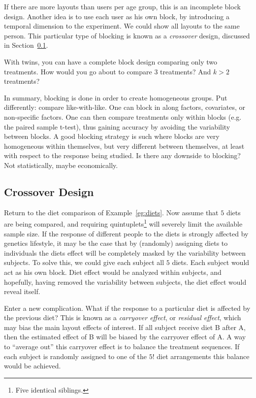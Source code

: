 If there are more layouts than users per age group, this is an incomplete block design. 
Another idea is to use each user as his own block, by introducing a temporal dimension to the experiment.
We could show all layouts to the same person. 
This particular type of blocking is known as a \emph{crossover} design, discussed in Section~\ref{sec:crossover}.

\begin{think}
	With twins, you can have a complete block design comparing only two treatments. 
	How would you go about to compare $3$ treatments?
	And $k>2$ treatments?
\end{think}

In summary, blocking is done in order to create homogeneous groups. 
Put differently: compare like-with-like. 
One can block in along factors, covariates, or non-specific factors. 
One can then compare treatments only within blocks (e.g. the paired sample t-test), thus gaining accuracy by avoiding the variability between blocks. 
A good blocking strategy is such where blocks are very homogeneous within themselves, but very different between themselves, at least with respect to the response being studied. 
Is there any downside to blocking? Not statistically, maybe economically. 







\subsection{Crossover Design}
\label{sec:crossover}

Return to the diet comparison of Example~\ref{eg:diets}. 
Now assume that $5$ diets are being compared, and requiring quintuplets\footnote{Five identical siblings.} will severely limit the available sample size. 
If the response of different people to the diets is strongly affected by genetics \andor lifestyle, it may be the case that by (randomly) assigning diets to individuals the diets effect will be completely masked by the variability between subjects. 
To solve this, we could give each subject all $5$ diets. 
Each subject would act as his own block.
Diet effect would be analyzed within subjects, and hopefully, having removed the variability between subjects, the diet effect would reveal itself. 

Enter a new complication. 
What if the response to a particular diet is affected by the previous diet?
This is known as a \emph{carryover effect}, or \emph{residual effect}, which may bias the main layout effects of interest. 
If all subject receive diet B after A, then the estimated effect of B will be biased by the carryover effect of A. 
A way to ``average out'' this carryover effect is to balance the treatment sequences. 
If each subject is randomly assigned to one of the $5!$ diet arrangements this balance would be achieved.

